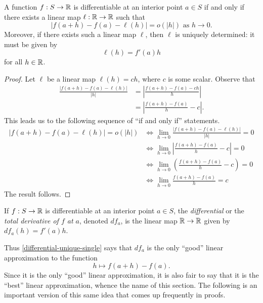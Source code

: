 \begin{proposition} \label{differential-unique-single}
	A function $f : S \to \mathbb{R}$ is differentiable at an interior point $a \in S$ if and only if there exists a linear map $\ell : \mathbb{R} \to \mathbb{R}$ such that
	\[ |f(a+h)-f(a) - \ell(h)| = o(|h|) \text{ as } h \to 0. \]
	Moreover, if there exists such a linear map $\ell$, then $\ell$ is uniquely determined: it must be given by \[ \ell(h) = f'(a)h \]
	for all $h \in \mathbb{R}$. 
\end{proposition}

\begin{proof}
	Let $\ell$ be a linear map $\ell(h) = ch$, where $c$ is some scalar. Observe that
	\[ \begin{aligned} \frac{|f(a+h)-f(a)-\ell(h)|}{|h|} &= \left| \frac{f(a+h)-f(a) - ch}{h} \right| \\
	&= \left| \frac{f(a+h)-f(a)}{h} - c \right|. \end{aligned} \]
	This leads us to the following sequence of ``if and only if'' statements. 
	\[ \begin{aligned} |f(a+h)-f(a)-\ell(h)| = o(|h|) &\iff \lim_{h \to 0} \frac{|f(a+h)-f(a)-\ell(h)|}{|h|} = 0 \\
	&\iff \lim_{h \to 0} \left| \frac{f(a+h)-f(a)}{h} - c \right| = 0 \\
	&\iff \lim_{h \to 0} \left( \frac{f(a+h)-f(a)}{h} - c \right) = 0 \\
	&\iff \lim_{h \to 0} \frac{f(a+h)-f(a)}{h} = c \end{aligned} \]
	The result follows. 
\end{proof}

\begin{definition}
	If $f : S \to \mathbb{R}$ is differentiable at an interior point $a \in S$, the \emph{differential} or the \emph{total derivative of $f$ at $a$}, denoted $df_a$, is the linear map $\mathbb{R} \to \mathbb{R}$ given by $df_a(h) = f'(a)h$. 
\end{definition}

Thus \cref{differential-unique-single} says that $df_a$ is the only ``good'' linear approximation to the function \[ h \mapsto f(a+h)-f(a). \] Since it is the only ``good'' linear approximation, it is also fair to say that it is the ``best'' linear approximation, whence the name of this section. The following is an important version of this same idea that comes up frequently in proofs. 


